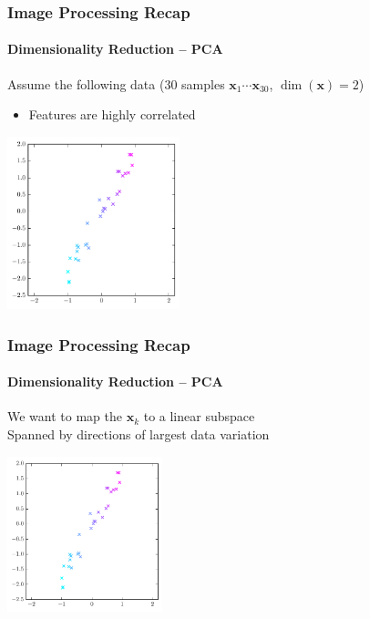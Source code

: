 \documentclass[xetex,professionalfont]{beamer}
\renewcommand{\vec}[1]{\ensuremath{\mathbf{#1}}}
\newcommand{\vx}{\vec{x}}
\begin{document}
\begin{frame}
\frametitle{Image Processing Recap}
\framesubtitle{Dimensionality Reduction -- PCA}

Assume the following data (30 samples $\vx_1\cdots\vx_{30}$, $\dim(\vx)=2$)
\begin{itemize}
    \item Features are highly correlated
\end{itemize}

\begin{center}
\includegraphics[width=5cm]{figures/pca-original.pdf}
\end{center}

\end{frame}


\begin{frame}
\frametitle{Image Processing Recap}
\framesubtitle{Dimensionality Reduction -- PCA}

We want to map the $\vx_k$ to a linear subspace\\\medskip
Spanned by directions of largest data variation

\begin{center}
\includegraphics[width=4.5cm]{figures/pca-original.pdf}
\end{center}

\end{frame}

\end{document}
